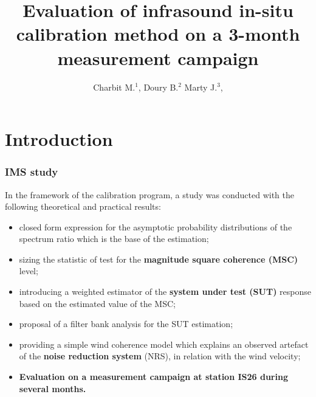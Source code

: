 \documentclass[handout,10pt]{beamer}
\title{Evaluation of infrasound in-situ calibration method on a 3-month measurement campaign}
\author{
 Charbit M.$^{1}$, 
 Doury B.$^{2}$
 Marty J.$^{3}$,
}
\begin{document}
 \sloppy

\begin{frame}
\maketitle
\end{frame}


 \section{Introduction}
\begin{frame}
 \frametitle{IMS study}
 In the framework of the calibration program, a study was conducted 
 with the following theoretical and practical results:
 \begin{itemize}
 \item
 closed form expression for the asymptotic probability distributions of the spectrum ratio which is the base of the estimation;
 \item
 sizing the statistic of test for the {\bf  magnitude square coherence (MSC)} level;
 \item
 introducing a weighted estimator of the {\bf system under test (SUT)} response based on the estimated value of 
the MSC;
 \item
 proposal of a filter bank analysis for the SUT estimation;
 \item
 providing a simple wind coherence model which explains an observed artefact of the {\bf noise reduction system} (NRS), in relation with the wind velocity;
 \item
{\bf \color{red} Evaluation on a measurement campaign at station IS26 during several months.}
 \end{itemize}
 
 
\end{frame}
\end{document}
